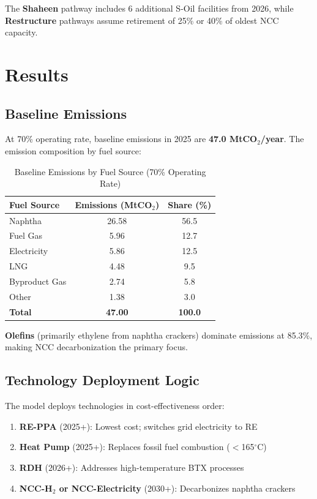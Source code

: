 \documentclass[12pt,a4paper]{article}
\begin{document}
The \textbf{Shaheen} pathway includes 6 additional S-Oil facilities from 2026, while \textbf{Restructure} pathways assume retirement of 25\% or 40\% of oldest NCC capacity.

\section{Results}

\subsection{Baseline Emissions}

At 70\% operating rate, baseline emissions in 2025 are \textbf{47.0 MtCO$_2$/year}. The emission composition by fuel source:

\begin{table}[H]
\centering
\caption{Baseline Emissions by Fuel Source (70\% Operating Rate)}
\begin{tabular}{lcc}
\toprule
Fuel Source & Emissions (MtCO$_2$) & Share (\%) \\
\midrule
Naphtha & 26.58 & 56.5 \\
Fuel Gas & 5.96 & 12.7 \\
Electricity & 5.86 & 12.5 \\
LNG & 4.48 & 9.5 \\
Byproduct Gas & 2.74 & 5.8 \\
Other & 1.38 & 3.0 \\
\midrule
\textbf{Total} & \textbf{47.00} & \textbf{100.0} \\
\bottomrule
\end{tabular}
\end{table}

\textbf{Olefins} (primarily ethylene from naphtha crackers) dominate emissions at 85.3\%, making NCC decarbonization the primary focus.

\subsection{Technology Deployment Logic}

The model deploys technologies in cost-effectiveness order:

\begin{enumerate}
    \item \textbf{RE-PPA} (2025+): Lowest cost; switches grid electricity to RE
    \item \textbf{Heat Pump} (2025+): Replaces fossil fuel combustion ($<$165$^\circ$C)
    \item \textbf{RDH} (2026+): Addresses high-temperature BTX processes
    \item \textbf{NCC-H$_2$ or NCC-Electricity} (2030+): Decarbonizes naphtha crackers
\end{enumerate}
\end{document}
